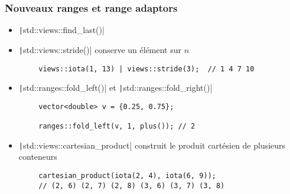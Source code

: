 \documentclass[C++.tex]{subfiles}
\begin{document}
\begin{frame}[fragile]
	\frametitle{Nouveaux ranges et range adaptors}
	\begin{itemize}
		\item \texttt|std::views::find_last()|
		\item \texttt|std::views::stride()| conserve un élément sur $n$
	\end{itemize}

	\begin{verbatim}
		views::iota(1, 13) | views::stride(3);  // 1 4 7 10
	\end{verbatim}

	\begin{itemize}
		\item \texttt|std::ranges::fold_left()| et \texttt|std::ranges::fold_right()|
	\end{itemize}

	\begin{verbatim}
		vector<double> v = {0.25, 0.75};

		ranges::fold_left(v, 1, plus()); // 2
	\end{verbatim}

	\begin{itemize}
		\item \texttt|std::views::cartesian_product| construit le produit cartésien de plusieurs conteneurs
	\end{itemize}

	\begin{verbatim}
		cartesian_product(iota(2, 4), iota(6, 9));
		// (2, 6) (2, 7) (2, 8) (3, 6) (3, 7) (3, 8)
	\end{verbatim}



\end{frame}
\end{document}
